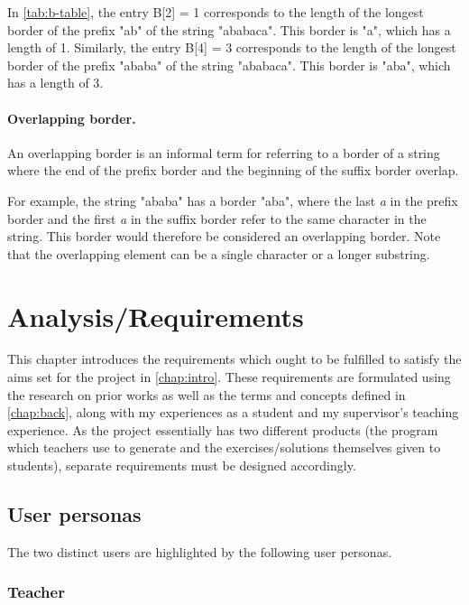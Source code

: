 \documentclass{l4proj}
\begin{document}
In \autoref{tab:b-table}, the entry B[2] = 1 corresponds to the length of the longest border of the prefix "ab" of the string "ababaca". This border is "a", which has a length of 1. Similarly, the entry B[4] = 3 corresponds to the length of the longest border of the prefix "ababa" of the string "ababaca". This border is "aba", which has a length of 3.

\subsubsection{Overlapping border.}
An overlapping border is an informal term for referring to a border of a string where the end of the prefix border and the beginning of the suffix border overlap.

For example, the string "ababa" has a border "aba", where the last \emph{a} in the prefix border and the first \emph{a} in the suffix border refer to the same character in the string. This border would therefore be considered an overlapping border. Note that the overlapping element can be a single character or a longer substring.


\chapter{Analysis/Requirements}
\label{chap:req}

This chapter introduces the requirements which ought to be fulfilled to satisfy the aims set for the project in \autoref{chap:intro}. These requirements are formulated using the research on prior works as well as the terms and concepts defined in \autoref{chap:back}, along with my experiences as a student and my supervisor's teaching experience. As the project essentially has two different products (the program which teachers use to generate and the exercises/solutions themselves given to students), separate requirements must be designed accordingly.
\section{User personas}

The two distinct users are highlighted by the following user personas.

\subsection{Teacher}
\end{document}
